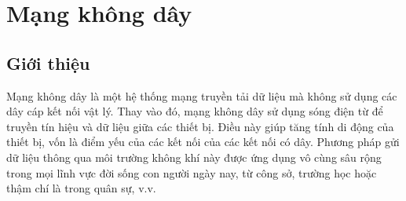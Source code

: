 \documentclass{uetgraduation}
\begin{document}
\section{Mạng không dây}
\subsection{Giới thiệu}
Mạng không dây là một hệ thống mạng truyền tải dữ liệu mà không sử dụng các dây cáp kết nối vật lý. Thay vào đó, mạng không dây sử dụng sóng
điện từ để truyền tín hiệu và dữ liệu giữa các thiết bị. Điều này giúp tăng tính di động của thiết bị, vốn là điểm yếu của các kết nối của các
kết nối có dây. Phương pháp gửi dữ liệu thông qua môi trường không khí này được ứng dụng vô cùng sâu rộng trong mọi lĩnh vực đời sống con người
ngày nay, từ công sở, trường học hoặc thậm chí là trong quân sự, v.v.
\end{document}
